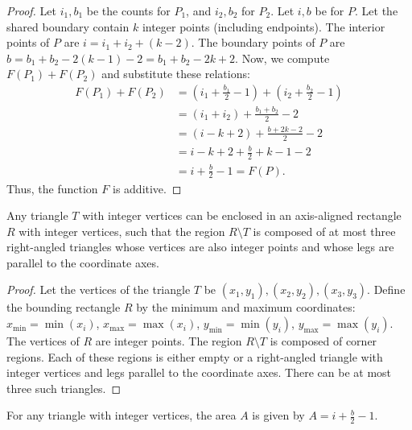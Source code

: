 \begin{proof}
    Let $i_1, b_1$ be the counts for $P_1$, and $i_2, b_2$ for $P_2$. Let $i, b$ be for $P$.
    Let the shared boundary contain $k$ integer points (including endpoints).
    The interior points of $P$ are $i = i_1 + i_2 + (k-2)$.
    The boundary points of $P$ are $b = b_1 + b_2 - 2(k-1) - 2 = b_1 + b_2 - 2k + 2$.
    Now, we compute $F(P_1) + F(P_2)$ and substitute these relations:
    \begin{align*}
        F(P_1) + F(P_2) &= \left(i_1 + \frac{b_1}{2} - 1\right) + \left(i_2 + \frac{b_2}{2} - 1\right) \\
        &= (i_1 + i_2) + \frac{b_1+b_2}{2} - 2 \\
        &= (i-k+2) + \frac{b+2k-2}{2} - 2 \\
        &= i-k+2 + \frac{b}{2} + k - 1 - 2 \\
        &= i + \frac{b}{2} - 1 = F(P).
    \end{align*}
    Thus, the function $F$ is additive.
\end{proof}

\begin{lemma}
    \label{lem:Triangle_in_Rectangle_Decomposition}
    Any triangle $T$ with integer vertices can be enclosed in an axis-aligned rectangle $R$ with integer vertices, such that the region $R \setminus T$ is composed of at most three right-angled triangles whose vertices are also integer points and whose legs are parallel to the coordinate axes.
\end{lemma}

\begin{proof}
    Let the vertices of the triangle $T$ be $(x_1, y_1), (x_2, y_2), (x_3, y_3)$.
    Define the bounding rectangle $R$ by the minimum and maximum coordinates: $x_{\min} = \min(x_i)$, $x_{\max} = \max(x_i)$, $y_{\min} = \min(y_i)$, $y_{\max} = \max(y_i)$. The vertices of $R$ are integer points.
    The region $R \setminus T$ is composed of corner regions. Each of these regions is either empty or a right-angled triangle with integer vertices and legs parallel to the coordinate axes. There can be at most three such triangles.
\end{proof}

\begin{lemma}
    \label{lem:Area_of_a_General_Triangle}
    For any triangle with integer vertices, the area $A$ is given by $A = i + \frac{b}{2} - 1$.
\end{lemma}

